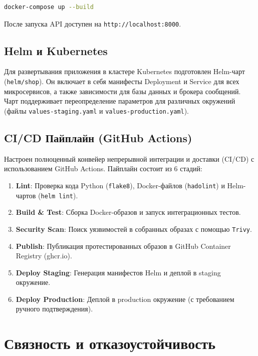 \documentclass[14pt]{article}
\begin{document}
\begin{lstlisting}[language=bash]
docker-compose up --build
\end{lstlisting}

После запуска API доступен на \texttt{http://localhost:8000}.

\subsection{Helm и Kubernetes}

Для развертывания приложения в кластере Kubernetes подготовлен Helm-чарт (\texttt{helm/shop}). Он включает в себя манифесты Deployment и Service для всех микросервисов, а также зависимости для базы данных и брокера сообщений. Чарт поддерживает переопределение параметров для различных окружений (файлы \texttt{values-staging.yaml} и \texttt{values-production.yaml}).

\subsection{CI/CD Пайплайн (GitHub Actions)}

Настроен полноценный конвейер непрерывной интеграции и доставки (CI/CD) с использованием GitHub Actions. Пайплайн состоит из 6 стадий:
\begin{enumerate}
    \item \textbf{Lint}: Проверка кода Python (\texttt{flake8}), Docker-файлов (\texttt{hadolint}) и Helm-чартов (\texttt{helm lint}).
    \item \textbf{Build \& Test}: Сборка Docker-образов и запуск интеграционных тестов.
    \item \textbf{Security Scan}: Поиск уязвимостей в собранных образах с помощью \texttt{Trivy}.
    \item \textbf{Publish}: Публикация протестированных образов в GitHub Container Registry (ghcr.io).
    \item \textbf{Deploy Staging}: Генерация манифестов Helm и деплой в staging окружение.
    \item \textbf{Deploy Production}: Деплой в production окружение (с требованием ручного подтверждения).
\end{enumerate}

\section{Связность и отказоустойчивость}
\end{document}
